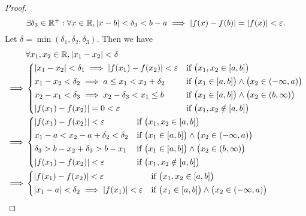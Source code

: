 \begin{proof}
  \[
    \exists \delta_3 \in \mathbb{R}^+ : \forall x \in \mathbb{R}, \left\lvert x - b\right\rvert < \delta_3 < b - a \implies \left\lvert f(x) - f(b)\right\rvert = \left\lvert f(x)\right\rvert < \varepsilon.
  \]
  Let \(\delta = \min(\delta_1, \delta_2, \delta_3)\).
  Then we have
  \begin{align*}
             & \forall x_1, x_2 \in \R, \abs{x_1 - x_2} < \delta                                                                                                          \\
    \implies & \begin{dcases}
                 \abs{x_1 - x_2} < \delta_1 \implies \abs{f(x_1) - f(x_2)} < \varepsilon & \text{if } \big(x_1, x_2 \in [a, b]\big)                                 \\
                 x_1 - x_2 < \delta_2 \implies a \leq x_1 < x_2 + \delta_2               & \text{if } \big(x_1 \in [a, b]\big) \land \big(x_2 \in (-\infty, a)\big) \\
                 x_2 - x_1 < \delta_3 \implies x_2 - \delta_3 < x_1 \leq b               & \text{if } \big(x_1 \in [a, b]\big) \land \big(x_2 \in (b, \infty)\big)  \\
                 \abs{f(x_1) - f(x_2)} = 0 < \varepsilon                                 & \text{if } \big(x_1, x_2 \notin [a, b]\big)
               \end{dcases} \\
    \implies & \begin{dcases}
                 \abs{f(x_1) - f(x_2)} < \varepsilon     & \text{if } \big(x_1, x_2 \in [a, b]\big)                                 \\
                 x_1 - a < x_2 - a + \delta_2 < \delta_2 & \text{if } \big(x_1 \in [a, b]\big) \land \big(x_2 \in (-\infty, a)\big) \\
                 \delta_3 > b - x_2 + \delta_3 > b - x_1 & \text{if } \big(x_1 \in [a, b]\big) \land \big(x_2 \in (b, \infty)\big)  \\
                 \abs{f(x_1) - f(x_2)} < \varepsilon     & \text{if } \big(x_1, x_2 \notin [a, b]\big)
               \end{dcases}                                 \\
    \implies & \begin{dcases}
                 \abs{f(x_1) - f(x_2)} < \varepsilon                          & \text{if } \big(x_1, x_2 \in [a, b]\big)                                 \\
                 \abs{x_1 - a} < \delta_2 \implies \abs{f(x_1)} < \varepsilon & \text{if } \big(x_1 \in [a, b]\big) \land \big(x_2 \in (-\infty, a)\big) \\

\end{dcases}
\end{align*}
\end{proof}
